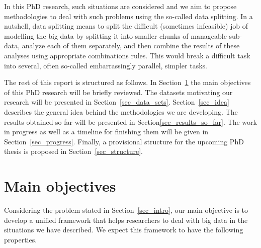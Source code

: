 \documentclass[14pt]{article}
\begin{document}
In this PhD research, such situations are considered and we aim to propose methodologies to deal with such problems using the so-called data splitting. In a nutshell, data splitting means to split the difficult (sometimes infeasible) job of modelling the big data by splitting it into smaller chunks of manageable sub-data, analyze each of them separately, and then combine the results of these analyses using appropriate combinations rules. This would break a difficult task into several, often so-called embarrassingly parallel, simpler tasks.

The rest of this report is structured as follows. In Section~\ref{sec_objective} the main objectives of this PhD research will be briefly reviewed. The datasets motivating our research will be presented in Section~\ref{sec_data_sets}. Section~\ref{sec_idea} describes the general idea behind the methodologies we are developing. The results obtained so far will be presented in Section\ref{sec_results_so_far}. The work in progress as well as a timeline for finishing them will be given in Section~\ref{sec_progress}. Finally, a provisional structure for the upcoming PhD thesis is proposed in Section~\ref{sec_structure}. 

\section{Main objectives}
\label{sec_objective}
Considering the problem stated in Section~\ref{sec_intro}, our main objective is to develop a unified framework that helps researchers to deal with big data in the situations we have described. We expect this framework to have the following properties.
\end{document}
